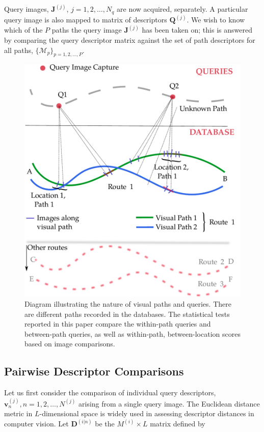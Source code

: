 Query images, $\mathbf{J}^{(j)}$, $j=1,2,\ldots,N_q$ are now acquired, separately.  A particular query image is also mapped to matrix of descriptors $\mathbf{Q}^{(j)}$. We wish to know which of the $P$ paths the query image $\mathbf{J}^{(j)}$ has been taken on; this is answered by comparing the query descriptor matrix against the set of path descriptors for all paths, $\lbrace \mathcal{M}_p \rbrace_{p=1,2,\ldots, P}$.

\begin{figure}
\centering
\includegraphics[width=\linewidth]{./gfx/Chapter02/pathexample.pdf}
\caption{Diagram illustrating the nature of visual paths and queries.  There are different paths recorded in the databases. The statistical tests reported in this paper compare the within-path queries and between-path queries, as well as within-path, between-location scores based on image comparisons.}
\label{fig:label}
\end{figure}


\subsection{Pairwise Descriptor Comparisons} \label{subsec:pairwise}

Let us first consider the comparison of individual query descriptors, $\mathbf{v}_n^{(j)}, n=1,2,\ldots,N^{(j)}$ arising from a single query image.  The Euclidean distance metric in $L$-dimensional space is widely used in assessing descriptor distances in computer vision.  Let $\mathbf{D}^{(i|n)}$ be the $M^{(i)}\times L$ matrix defined by

